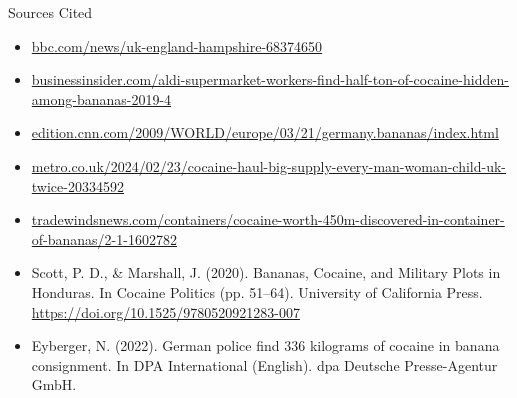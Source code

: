 \documentclass{beamer}
\begin{document}
\begin{frame}{Sources Cited}
\begin{itemize}
    \item \url{bbc.com/news/uk-england-hampshire-68374650}
    \item \url{businessinsider.com/aldi-supermarket-workers-find-half-ton-of-cocaine-hidden-among-bananas-2019-4}
    \item \url{edition.cnn.com/2009/WORLD/europe/03/21/germany.bananas/index.html}
    \item \url{metro.co.uk/2024/02/23/cocaine-haul-big-supply-every-man-woman-child-uk-twice-20334592}
    \item \url{tradewindsnews.com/containers/cocaine-worth-450m-discovered-in-container-of-bananas/2-1-1602782}
    \item Scott, P. D., \& Marshall, J. (2020). Bananas, Cocaine, and Military Plots in Honduras. In Cocaine Politics (pp. 51–64). University of California Press. \url{https://doi.org/10.1525/9780520921283-007}
    \item Eyberger, N. (2022). German police find 336 kilograms of cocaine in banana consignment. In DPA International (English). dpa Deutsche Presse-Agentur GmbH.
\end{itemize}
\end{frame}
\end{document}
